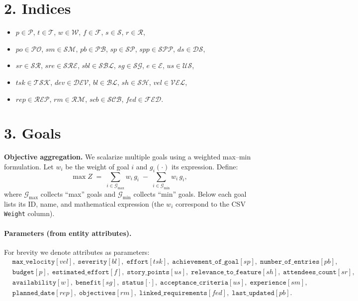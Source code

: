 \documentclass[11pt,a4paper]{article}
\begin{document}
\section{2. Indices}
\begin{itemize}[leftmargin=2em]
  \item $p \in \mathcal{P}$,\;
        $t \in \mathcal{T}$,\;
        $w \in \mathcal{W}$,\;
        $f \in \mathcal{F}$,\;
        $s \in \mathcal{S}$,\;
        $r \in \mathcal{R}$,
  \item $po \in \mathcal{PO}$,\;
        $sm \in \mathcal{SM}$,\;
        $pb \in \mathcal{PB}$,\;
        $sp \in \mathcal{SP}$,\;
        $spp \in \mathcal{SPP}$,\;
        $ds \in \mathcal{DS}$,
  \item $sr \in \mathcal{SR}$,\;
        $sre \in \mathcal{SRE}$,\;
        $sbl \in \mathcal{SBL}$,\;
        $sg \in \mathcal{SG}$,\;
        $e \in \mathcal{E}$,\;
        $us \in \mathcal{US}$,
  \item $tsk \in \mathcal{TSK}$,\;
        $dev \in \mathcal{DEV}$,\;
        $bl \in \mathcal{BL}$,\;
        $sh \in \mathcal{SH}$,\;
        $vel \in \mathcal{VEL}$,
  \item $rep \in \mathcal{REP}$,\;
        $rm \in \mathcal{RM}$,\;
        $scb \in \mathcal{SCB}$,\;
        $fed \in \mathcal{FED}$.
\end{itemize}

\section{3. Goals}
\noindent\textbf{Objective aggregation.}
We scalarize multiple goals using a weighted max--min formulation. Let $w_i$ be the weight of goal $i$ and $g_i(\cdot)$ its expression. Define:
\[
\max Z \;=\; \sum_{i \in \mathcal{G}_{\max}} w_i\, g_i \;-\; \sum_{i \in \mathcal{G}_{\min}} w_i\, g_i,
\]
where $\mathcal{G}_{\max}$ collects ``max'' goals and $\mathcal{G}_{\min}$ collects ``min'' goals. Below each goal lists its ID, name, and mathematical expression (the $w_i$ correspond to the CSV \texttt{Weight} column).

\paragraph{Parameters (from entity attributes).}
For brevity we denote attributes as parameters:
\begin{align*}
&\texttt{max\_velocity}[vel],\;
\texttt{severity}[bl],\;
\texttt{effort}[tsk],\;
\texttt{achievement\_of\_goal}[sp],\;
\texttt{number\_of\_entries}[pb],\\
&\texttt{budget}[p],\;
\texttt{estimated\_effort}[f],\;
\texttt{story\_points}[us],\;
\texttt{relevance\_to\_feature}[sh],\;
\texttt{attendees\_count}[sr],\\
&\texttt{availability}[w],\;
\texttt{benefit}[sg],\;
\texttt{status}[\cdot],\;
\texttt{acceptance\_criteria}[us],\;
\texttt{experience}[sm],\\
&\texttt{planned\_date}[rep],\;
\texttt{objectives}[rm],\;
\texttt{linked\_requirements}[fed],\;
\texttt{last\_updated}[pb].
\end{align*}
\end{document}
